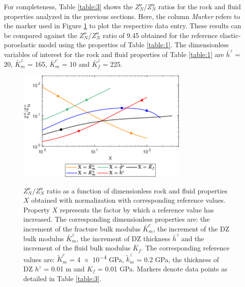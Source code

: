 \documentclass[draft]{agujournal2019}
\begin{document}
For completeness, Table \ref{table:3} shows the $Z_N^o/Z_N^u$  ratios for the rock and fluid properties analyzed in the previous sections. Here, the column \emph{Marker} refers to the marker used in Figure \ref{fig:10} to plot the respective data entry.
These results can be compared against the  $Z_N^o/Z_N^u$ ratio  of 9.45 obtained for the reference elastic-poroelastic model using the properties of Table \ref{table:1}. The dimensionless variables of interest for the rock and fluid properties of Table \ref{table:1} are $\bar{h}^z$ = 20, $\bar{K}_m^z$ = 165, $\bar{K}_m^c$ = 10 and $\bar{K}_f^z$ = 225.

\begin{figure}
\centering
      {
        \includegraphics[width=85mm, height=55mm]{Figure10.pdf}
        }
\caption { $Z_N^o / Z_N^u$ ratio as a function of dimensionless rock and fluid properties $X$ obtained with normalization with corresponding reference values. Property $X$ represents the factor by which a reference value has increased. The corresponding dimensionless properties are: the increment of the fracture bulk modulus $\bar{K}_m^c$, the increment of the DZ bulk modulus $\bar{K}_m^z$, the increment of DZ thickness $\bar{h}^z$ and the increment of the fluid bulk modulus $\bar{K}_f$. The corresponding reference values are:  $\tilde{K}_m^c$ = \num{4e-4} GPa,  $\tilde{k}_m^z$ = 0.2 GPa, the thickness of DZ $ h^z$ = 0.01 m and $ K_f$ = 0.01 GPa. Markers denote data points as detailed in Table \ref{table:3}.
}
\label{fig:10}
\end{figure}
\end{document}
